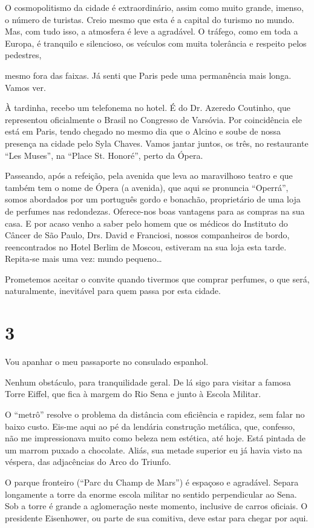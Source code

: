 O cosmopolitismo da cidade é extraordinário, assim como muito grande, imenso, o número de turistas. Creio mesmo que esta é a capital do turismo no mundo. Mas, com tudo isso, a atmosfera é leve a agradável. O tráfego, como em toda a Europa, é tranquilo e silencioso, os veículos com muita tolerância e respeito pelos pedestres,

mesmo fora das faixas. Já senti que Paris pede uma permanência mais longa. Vamos ver.

À tardinha, recebo um telefonema no hotel. É do Dr. Azeredo Coutinho, que representou oficialmente o Brasil no Congresso de Varsóvia. Por coincidência ele está em Paris, tendo chegado no mesmo dia que o Alcino e soube de nossa presença na cidade pelo Syla Chaves. Vamos jantar juntos, os três, no restaurante “Les Muses”, na “Place St. Honoré”, perto da Ópera.

Passeando, após a refeição, pela avenida que leva ao maravilhoso teatro e que também tem o nome de Ópera (a avenida), que aqui se pronuncia “Operrá”, somos abordados por um português gordo e bonachão, proprietário de uma loja de perfumes nas redondezas. Oferece-nos boas vantagens para as compras na sua casa. E por acaso venho a saber pelo homem que os médicos do Instituto do Câncer de São Paulo, Drs. David e Franciosi, nossos companheiros de bordo, reencontrados no Hotel Berlim de Moscou, estiveram na sua loja esta tarde. Repita-se mais uma vez: mundo pequeno\ldots

Prometemos aceitar o convite quando tivermos que comprar perfumes, o que será, naturalmente, inevitável para quem passa por esta cidade.

\section*{3 \adfflatleafright {}}
Vou apanhar o meu passaporte no consulado espanhol.

Nenhum obstáculo, para tranquilidade geral. De lá sigo para visitar a famosa Torre Eiffel, que fica à margem do Rio Sena e junto à Escola Militar.

O “metrô” resolve o problema da distância com eficiência e rapidez, sem falar no baixo custo. Eis-me aqui ao pé da lendária construção metálica, que, confesso, não me impressionava muito como beleza nem estética, até hoje. Está pintada de um marrom puxado a chocolate. Aliás, sua metade superior eu já havia visto na véspera, das adjacências do Arco do Triunfo.

O parque fronteiro (“Parc du Champ de Mars”) é espaçoso e agradável. Separa longamente a torre da enorme escola militar no sentido perpendicular ao Sena. Sob a torre é grande a aglomeração neste momento, inclusive de carros oficiais. O presidente Eisenhower, ou parte de sua comitiva, deve estar para chegar por aqui.

